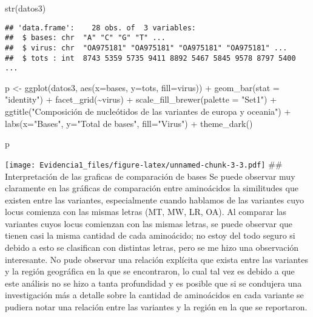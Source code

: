 \documentclass[
]{article}
\newenvironment{Shaded}{\begin{snugshade}}{\end{snugshade}}
\newcommand{\AttributeTok}[1]{\textcolor[rgb]{0.77,0.63,0.00}{#1}}
\newcommand{\FunctionTok}[1]{\textcolor[rgb]{0.00,0.00,0.00}{#1}}
\newcommand{\NormalTok}[1]{#1}
\newcommand{\OtherTok}[1]{\textcolor[rgb]{0.56,0.35,0.01}{#1}}
\newcommand{\SpecialCharTok}[1]{\textcolor[rgb]{0.00,0.00,0.00}{#1}}
\newcommand{\StringTok}[1]{\textcolor[rgb]{0.31,0.60,0.02}{#1}}
\begin{document}
\begin{Shaded}
\begin{Highlighting}[]
\FunctionTok{str}\NormalTok{(datos3)}
\end{Highlighting}
\end{Shaded}

\begin{verbatim}
## 'data.frame':    28 obs. of  3 variables:
##  $ bases: chr  "A" "C" "G" "T" ...
##  $ virus: chr  "OA975181" "OA975181" "OA975181" "OA975181" ...
##  $ tots : int  8743 5359 5735 9411 8892 5467 5845 9578 8797 5400 ...
\end{verbatim}

\begin{Shaded}
\begin{Highlighting}[]
\NormalTok{p }\OtherTok{\textless{}{-}} \FunctionTok{ggplot}\NormalTok{(datos3, }\FunctionTok{aes}\NormalTok{(}\AttributeTok{x=}\NormalTok{bases, }\AttributeTok{y=}\NormalTok{tots, }\AttributeTok{fill=}\NormalTok{virus)) }\SpecialCharTok{+} \FunctionTok{geom\_bar}\NormalTok{(}\AttributeTok{stat =} \StringTok{"identity"}\NormalTok{) }\SpecialCharTok{+} \FunctionTok{facet\_grid}\NormalTok{(}\SpecialCharTok{\textasciitilde{}}\NormalTok{virus) }\SpecialCharTok{+} \FunctionTok{scale\_fill\_brewer}\NormalTok{(}\AttributeTok{palette =} \StringTok{"Set1"}\NormalTok{) }\SpecialCharTok{+} \FunctionTok{ggtitle}\NormalTok{(}\StringTok{"Composición de nucleótidos de las variantes de europa y oceania"}\NormalTok{) }\SpecialCharTok{+} \FunctionTok{labs}\NormalTok{(}\AttributeTok{x=}\StringTok{"Bases"}\NormalTok{, }\AttributeTok{y=}\StringTok{"Total de bases"}\NormalTok{, }\AttributeTok{fill=}\StringTok{"Virus"}\NormalTok{) }\SpecialCharTok{+} \FunctionTok{theme\_dark}\NormalTok{()}

\NormalTok{p}
\end{Highlighting}
\end{Shaded}

\texttt{[image: Evidencia1\_files/figure-latex/unnamed-chunk-3-3.pdf]}
\#\# Interpretación de las graficas de comparación de bases Se puede
observar muy claramente en las gráficas de comparación entre aminoácidos
la similitudes que existen entre las variantes, especialmente cuando
hablamos de las variantes cuyo locus comienza con las mismas letras (MT,
MW, LR, OA). Al comparar las variantes cuyos locus comienzan con las
mismas letras, se puede observar que tienen casi la misma cantidad de
cada aminoácido; no estoy del todo seguro si debido a esto se clasifican
con distintas letras, pero se me hizo una observación interesante. No
pude observar una relación explícita que exista entre las variantes y la
región geográfica en la que se encontraron, lo cual tal vez es debido a
que este análisis no se hizo a tanta profundidad y es posible que si se
condujera una investigación más a detalle sobre la cantidad de
aminoácidos en cada variante se pudiera notar una relación entre las
variantes y la región en la que se reportaron.
\end{document}
